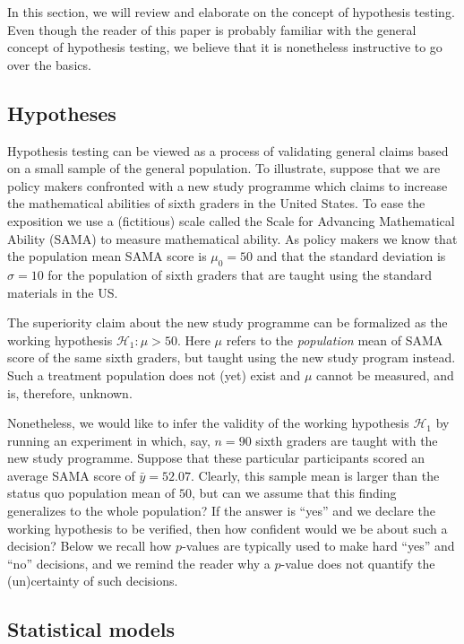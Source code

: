 \documentclass[english,,doc,floatsintext]{apa6}
\begin{document}
In this section, we will review and elaborate on the concept of hypothesis testing. Even though the reader of this paper is probably familiar with the general concept of hypothesis testing, we believe that it is nonetheless instructive to go over the basics.

\hypertarget{hypotheses}{%
\subsection{Hypotheses}\label{hypotheses}}

Hypothesis testing can be viewed as a process of validating general claims based on a small sample of the general population. To illustrate, suppose that we are policy makers confronted with a new study programme which claims to increase the mathematical abilities of sixth graders in the United States. To ease the exposition we use a (fictitious) scale called the Scale for Advancing Mathematical Ability (SAMA) to measure mathematical ability. As policy makers we know that the population mean SAMA score is \(\mu_{0}=50\) and that the standard deviation is \(\sigma=10\) for the population of sixth graders that are taught using the standard materials in the US.

The superiority claim about the new study programme can be formalized as the working hypothesis \(\mathcal{H}_{1} : \mu > 50\). Here \(\mu\) refers to the \emph{population} mean of SAMA score of the same sixth graders, but taught using the new study program instead. Such a treatment population does not (yet) exist and \(\mu\) cannot be measured, and is, therefore, unknown.

Nonetheless, we would like to infer the validity of the working hypothesis \(\mathcal{H}_{1}\) by running an experiment in which, say, \(n=90\) sixth graders are taught with the new study programme. Suppose that these particular participants scored an average SAMA score of \(\bar{y} = 52.07\). Clearly, this sample mean is larger than the status quo population mean of \(50\), but can we assume that this finding generalizes to the whole population? If the answer is \enquote{yes} and we declare the working hypothesis to be verified, then how confident would we be about such a decision? Below we recall how \(p\)-values are typically used to make hard \enquote{yes} and \enquote{no} decisions, and we remind the reader why a \(p\)-value does not quantify the (un)certainty of such decisions.

\hypertarget{statistical-models}{%
\subsection{Statistical models}\label{statistical-models}}
\end{document}
